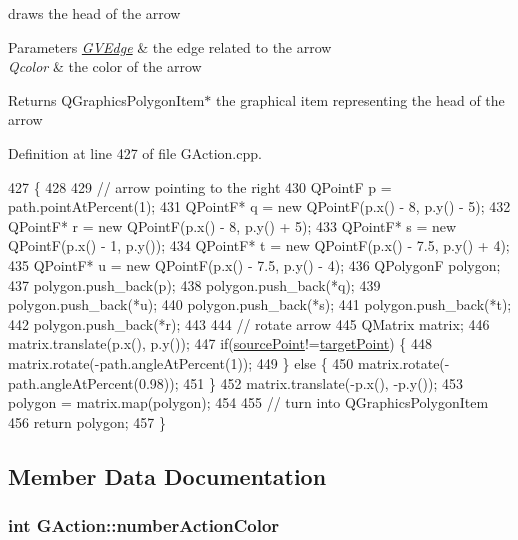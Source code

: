 draws the head of the arrow 


\begin{DoxyParams}{Parameters}
{\em \hyperlink{structGVEdge}{G\+V\+Edge}} & the edge related to the arrow \\
\hline
{\em Qcolor} & the color of the arrow\\
\hline
\end{DoxyParams}
\begin{DoxyReturn}{Returns}
Q\+Graphics\+Polygon\+Item$\ast$ the graphical item representing the head of the arrow 
\end{DoxyReturn}


Definition at line 427 of file G\+Action.\+cpp.


\begin{DoxyCode}
427                                                   \{
428 
429     \textcolor{comment}{// arrow pointing to the right}
430     QPointF p = path.pointAtPercent(1);
431     QPointF* q = \textcolor{keyword}{new} QPointF(p.x() - 8, p.y() - 5);
432     QPointF* r = \textcolor{keyword}{new} QPointF(p.x() - 8, p.y() + 5);
433     QPointF* s = \textcolor{keyword}{new} QPointF(p.x() - 1, p.y());
434     QPointF* t = \textcolor{keyword}{new} QPointF(p.x() - 7.5, p.y() + 4);
435     QPointF* u = \textcolor{keyword}{new} QPointF(p.x() - 7.5, p.y() - 4);
436     QPolygonF polygon;
437     polygon.push\_back(p);
438     polygon.push\_back(*q);
439     polygon.push\_back(*u);
440     polygon.push\_back(*s);
441     polygon.push\_back(*t);
442     polygon.push\_back(*r);
443 
444     \textcolor{comment}{// rotate arrow}
445     QMatrix matrix;
446     matrix.translate(p.x(), p.y());
447     \textcolor{keywordflow}{if}(\hyperlink{classGAction_adf67bcd561238d7626566cebeee2a151}{sourcePoint}!=\hyperlink{classGAction_ad6992ac8b540932c370f5b46c48bbe70}{targetPoint}) \{
448         matrix.rotate(-path.angleAtPercent(1));
449     \} \textcolor{keywordflow}{else} \{
450         matrix.rotate(-path.angleAtPercent(0.98));
451     \}
452     matrix.translate(-p.x(), -p.y());
453     polygon = matrix.map(polygon);
454 
455     \textcolor{comment}{// turn into QGraphicsPolygonItem}
456     \textcolor{keywordflow}{return} polygon;
457 \}
\end{DoxyCode}


\subsection{Member Data Documentation}
\hypertarget{classGAction_aaa7f90de74ad249e8c0054728d1339d1}{
\subsubsection[{number\+Action\+Color}]{\setlength{\rightskip}{0pt plus 5cm}int G\+Action\+::number\+Action\+Color\hspace{0.3cm}{\ttfamily [protected]}}}\label{classGAction_aaa7f90de74ad249e8c0054728d1339d1}



